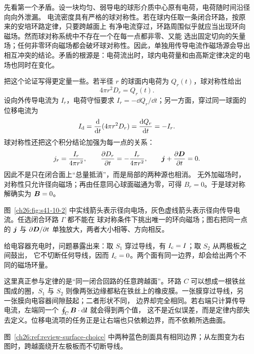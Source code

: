 {先看第一个矛盾。设一块均匀、弱导电的球形介质中心原有电荷，电荷随时间沿径向向外泄漏。
电流密度具有严格的球对称性。若在球内任取一条闭合环路，按原来的安培环路定律，只要跨越面上
有净电流穿过，环路周围似乎就应当出现环向磁场。然而球对称系统中不存在一个在每一点都非零、又能
选出固定切向的矢量场；任何非零环向磁场都会破坏球对称性。因此，单独用传导电流作磁场源会导出
相互冲突的结论。矛盾的根源是：电荷流出时，球内电荷量和由高斯定律决定的电场也同时在变化。

把这个论证写得更定量一些。若半径 $r$ 的球面内电荷为 $Q_r(t)$，球对称性给出
\begin{equation}
  4\pi r^2D_r=Q_r(t).
\end{equation}
设向外传导电流为 $I_r$，电荷守恒要求 $I_r=-\dd Q_r/\dd t$；另一方面，穿过同一球面的位移电流为
\begin{equation}
  I_{\rm d}=\frac{\mathop{}\!\mathrm d}{\mathop{}\!\mathrm d t}(4\pi r^2D_r)=\frac{\mathop{}\!\mathrm d Q_r}{\mathop{}\!\mathrm d t}=-I_r.
\end{equation}
球对称性还把这个积分结论加强为每一点的关系：
\[
 j_r=\frac{I_r}{4\pi r^2},\qquad
 \frac{\partial D_r}{\partial t}=-\frac{I_r}{4\pi r^2},
 \qquad \bm{j}+\frac{\partial\bm{D}}{\partial t}=0.
\]
因此不是只在闭合面上“总量抵消”，而是局部的两种源也相消。
无外加磁场时，对称性只允许径向磁场；再由任意同心球面磁通为零，可得 $B_r=0$。于是球对称解确实为 $\bm{B}=0$。

图~\ref{ch26:fig:s41-10-2} 中实线箭头表示径向电场，灰色虚线箭头表示径向传导电流。任选闭合环路 $\Gamma$ 都不能在
球对称条件下挑出唯一的环向磁场；图右把同一点的 $\bm{j}$ 与 $\partial\bm{D}/\partial t$ 单独放大，两者大小相等、方向相反。

\radialCurrentSphereDiagram

给电容器充电时，问题暴露出来：取 $S_1$ 穿过导线，有 $I_{\rm c}=I$；取 $S_2$ 从两极板之间鼓出，
它不切断任何导线，因而 $I_{\rm c}=0$。两个面有同一边界，却会给出两个不同的磁场环量。

这里真正参与定律的是“同一闭合回路的任意跨越面”。环路 $C$ 可以想成一根铁丝围成的圈，$S_1$ 与
$S_2$ 则像两张边缘都粘在铁丝上的橡皮膜。一张膜穿过导线，另一张膜向电容器间隙鼓起；二者形状不同，
边界却完全相同。若右端只计算传导电流，左端同一个 $\oint_C\bm{B}\cdot\mathop{}\!\mathrm d\bm{l}$ 就会得到两个值，
这不是近似误差，而是定律内部失去定义。位移电流项的任务正是让右端也只依赖边界，而不依赖所选曲面。

图~\ref{ch26:ref:review-surface-choice} 中两种蓝色剖面具有相同边界；从左图变为右图时，跨越面绕开左极板而不切断导线。

\displacementCurrentDiagram

}
